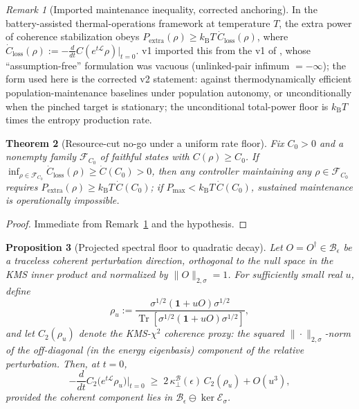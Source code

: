 \documentclass[11pt,a4paper]{article}
\theoremstyle{plain}
\newtheorem{theorem}{Theorem}[section]
\newtheorem{proposition}[theorem]{Proposition}
\theoremstyle{definition}
\theoremstyle{remark}
\newtheorem{remark}[theorem]{Remark}
\newcommand{\Tr}{\operatorname{Tr}}
\newcommand{\kB}{k_{\mathrm{B}}}
\newcommand{\eps}{\epsilon}
\newcommand{\kfl}{\kappa_{\perp}}
\begin{document}
\begin{remark}[Imported maintenance inequality, corrected anchoring]
\label{rem:imported}
In the battery-assisted thermal-operations framework at temperature $T$, the
extra power of coherence stabilization obeys $P_{\mathrm{extra}}(\rho) \ge
\kB T\, \dot{C}_{\mathrm{loss}}(\rho)$, where $\dot{C}_{\mathrm{loss}}(\rho)
:= -\frac{d}{dt}C(e^{t\mathcal{L}}\rho)|_{t=0}$. v1 imported this from the v1
of \cite{MaintWork}, whose ``assumption-free'' formulation was vacuous
(unlinked-pair infimum $= -\infty$); the form used here is the corrected v2
statement: against thermodynamically efficient population-maintenance
baselines under population autonomy, or unconditionally when the pinched
target is stationary; the unconditional total-power floor is $\kB T$ times
the entropy production rate.
\end{remark}

\begin{theorem}[Resource-cut no-go under a uniform rate floor]\label{thm:nogo}
Fix $C_0 > 0$ and a nonempty family $\mathcal{F}_{C_0}$ of faithful states
with $C(\rho) \ge C_0$. If
$\inf_{\rho\in\mathcal{F}_{C_0}} \dot{C}_{\mathrm{loss}}(\rho) \ge
\dot{C}(C_0) > 0$, then any controller maintaining any $\rho \in
\mathcal{F}_{C_0}$ requires $P_{\mathrm{extra}}(\rho) \ge \kB T\,
\dot{C}(C_0)$; if $P_{\max} < \kB T\,\dot{C}(C_0)$, sustained maintenance is
operationally impossible.
\end{theorem}

\begin{proof}
Immediate from Remark~\ref{rem:imported} and the hypothesis.
\end{proof}

\begin{proposition}[Projected spectral floor to quadratic decay]
\label{prop:floorlink}
Let $O = O^\dagger \in \mathcal{B}_\eps$ be a traceless coherent perturbation
direction, orthogonal to the null space in the KMS inner product and
normalized by $\|O\|_{2,\sigma} = 1$. For sufficiently small real $u$, define
\begin{equation}
\rho_u := \frac{\sigma^{1/2}(\mathbf{1} + uO)\sigma^{1/2}}
{\Tr[\sigma^{1/2}(\mathbf{1} + uO)\sigma^{1/2}]},
\end{equation}
and let $C_2(\rho_u)$ denote the KMS-$\chi^2$ coherence proxy: the squared
$\|\cdot\|_{2,\sigma}$-norm of the off-diagonal (in the energy eigenbasis)
component of the relative perturbation. Then, at $t = 0$,
\begin{equation}
-\frac{d}{dt} C_2\big(e^{t\mathcal{L}}\rho_u\big)\Big|_{t=0}
\;\ge\; 2\,\kfl^{\mathcal{B}}(\eps)\, C_2(\rho_u) + O(u^3),
\end{equation}
provided the coherent component lies in
$\mathcal{B}_\eps \ominus \ker\mathcal{E}_\sigma$.
\end{proposition}
\end{document}
